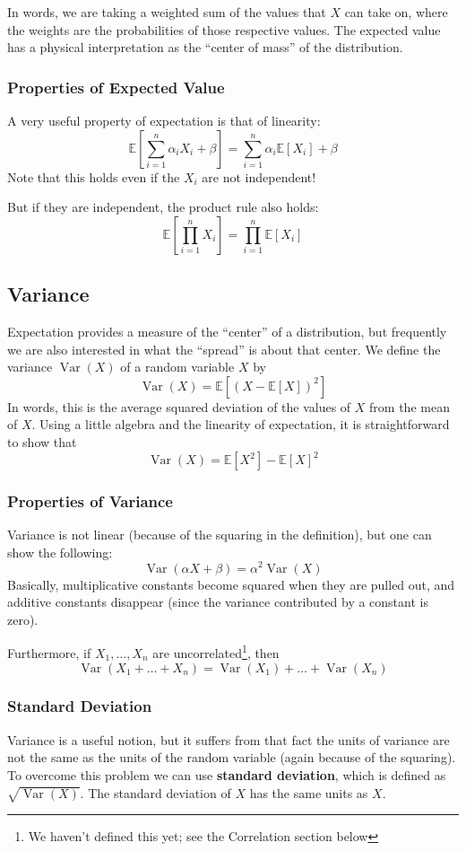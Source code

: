\documentclass{article}
\renewcommand{\ev}[1]{\mathbb{E}[#1]}
\renewcommand{\var}[1]{\operatorname{Var}(#1)}
\newcommand{\bigev}[1]{\mathbb{E}\left[#1\right]}
\newcommand{\term}[1]{\textbf{#1}}
\begin{document}
In words, we are taking a weighted sum of the values that $X$ can take on, where the weights are the probabilities of those respective values. The expected value has a physical interpretation as the ``center of mass'' of the distribution.

\subsubsection{Properties of Expected Value}
A very useful property of expectation is that of linearity:
\[\bigev{\sum_{i=1}^n \alpha_i X_i + \beta} = \sum_{i=1}^n \alpha_i \ev{X_i} + \beta\]
Note that this holds even if the $X_i$ are not independent!

But if they are independent, the product rule also holds:
\[\bigev{\prod_{i=1}^n X_i} = \prod_{i=1}^n \ev{X_i}\]

\subsection{Variance}
Expectation provides a measure of the ``center'' of a distribution, but frequently we are also interested in what the ``spread'' is about that center. We define the variance $\var{X}$ of a random variable $X$ by
\[\var{X} = \bigev{\left(X - \ev{X}\right)^2}\]
In words, this is the average squared deviation of the values of $X$ from the mean of $X$. Using a little algebra and the linearity of expectation, it is straightforward to show that
\[\var{X} = \ev{X^2} - \ev{X}^2\]

\subsubsection{Properties of Variance}
Variance is not linear (because of the squaring in the definition), but one can show the following:
\[\var{\alpha X + \beta} = \alpha^2 \var{X}\]
Basically, multiplicative constants become squared when they are pulled out, and additive constants disappear (since the variance contributed by a constant is zero).

Furthermore, if $X_1, \dots, X_n$ are uncorrelated\footnote{We haven't defined this yet; see the Correlation section below}, then
\[\var{X_1 + \dots + X_n} = \var{X_1} + \dots + \var{X_n}\]

\subsubsection{Standard Deviation}
Variance is a useful notion, but it suffers from that fact the units of variance are not the same as the units of the random variable (again because of the squaring). To overcome this problem we can use \term{standard deviation}, which is defined as $\sqrt{\var{X}}$. The standard deviation of $X$ has the same units as $X$.
\end{document}
